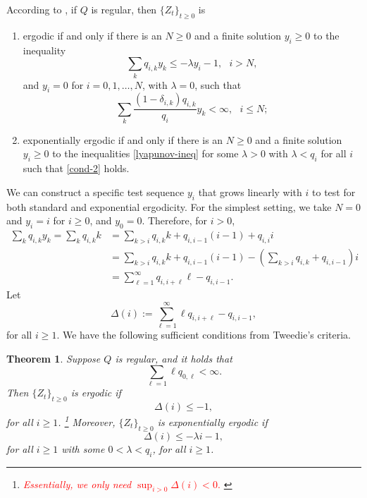 \documentclass[12pt]{article}
\newtheorem{thm}{Theorem}[section]
\newcommand{\red}[1]{\textcolor{red}{#1}}
\newcounter{con}%
\numberwithin{equation}{section}
\begin{document}
According to \cite[Theorem~3]{Tweedie81}, if $Q$ is regular, then $\{Z_t\}_{t\ge0}$ is 
\begin{enumerate}
	\item ergodic if and only if there is an $N\ge0$ and a finite solution $y_i\ge0$ to the inequality
		\begin{equation}\label{lyapunov-ineq}
	\sum_{k}q_{i,k}y_k\le -\lambda y_i-1,~~~i>N,
\end{equation}
and $y_i=0$ for $i=0,1,\dots,N$, with $\lambda=0$, such that 
\begin{equation}\label{cond-2}
	\sum_{k}\frac{(1-\delta_{i,k})q_{i,k}}{q_i}y_k<\infty,~~~i\le N;
\end{equation}
\item exponentially ergodic if and only if there is an $N\ge0$ and a finite solution $y_i\ge0$ to the inequalities \eqref{lyapunov-ineq} for some $\lambda>0$ with $\lambda<q_i$ for all $i$ such that \eqref{cond-2} holds.
\end{enumerate}

We can construct a specific test sequence $y_i$ that grows linearly with $i$ to test for both standard and exponential ergodicity. For the simplest setting, we take $N=0$ and $y_i=i$ for $i\ge0$, and $y_0=0$. Therefore, for $i>0$, 
\begin{align*}
	\sum_{k}q_{i,k}y_k=\sum_k q_{i,k}k&=\sum_{k>i}q_{i,k}k+q_{i,i-1}(i-1)+q_{i,i}i\\
					  &=\sum_{k>i}q_{i,k}k+q_{i,i-1}(i-1)-\left(\sum_{k>i}q_{i,k}+q_{i,i-1}\right)i\\
					  &=\sum_{\ell=1}^\infty q_{i,i+\ell}\ell-q_{i,i-1}.
\end{align*}
Let
\begin{equation}
	\Delta(i) := \sum_{\ell=1}^{\infty} \ell q_{i,i+\ell} - q_{i,i-1},
\end{equation}
for all $i\ge1$. We have the following sufficient conditions from Tweedie's criteria.

\begin{thm}
Suppose $Q$ is regular, and it holds that   
\begin{equation}
	\sum_{\ell=1}\ell q_{0,\ell}<\infty.
\end{equation}
Then $\{Z_t\}_{t\ge0}$ is ergodic if 
\begin{equation}
  \Delta(i)\le -1,
\end{equation}
for all $i\ge1$. \footnote{\red{Essentially, we only need 
$
\sup_{i>0}\Delta(i)<0.
$
}}
Moreover, $\{Z_t\}_{t\ge0}$ is exponentially ergodic if 
\begin{equation}
  \Delta(i)\le -\lambda i-1,
\end{equation}
for all $i\ge1$ with some $0<\lambda<q_i$, for all $i\ge1$.
\end{thm}
\end{document}
